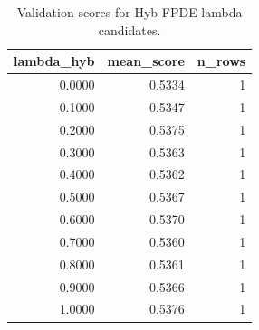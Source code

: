 \begin{table}[t]
\caption{Validation scores for Hyb-FPDE lambda candidates.}
\label{tab:lambda_distribution_computed}
\centering
\begin{tabular}{rrr}
\toprule
lambda\_hyb & mean\_score & n\_rows \\
\midrule
0.0000 & 0.5334 & 1 \\
0.1000 & 0.5347 & 1 \\
0.2000 & 0.5375 & 1 \\
0.3000 & 0.5363 & 1 \\
0.4000 & 0.5362 & 1 \\
0.5000 & 0.5367 & 1 \\
0.6000 & 0.5370 & 1 \\
0.7000 & 0.5360 & 1 \\
0.8000 & 0.5361 & 1 \\
0.9000 & 0.5366 & 1 \\
1.0000 & 0.5376 & 1 \\
\bottomrule
\end{tabular}

\end{table}
